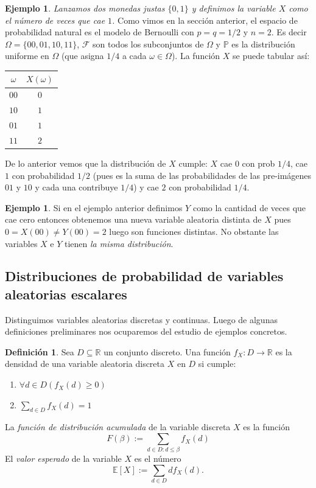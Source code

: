\documentclass[12pt]{amsart}
\theoremstyle{definition}
\newtheorem{definition}[lemma]{Definición}
\newtheorem{examplex}[lemma]{Ejemplo}
\renewcommand{\geq}{\geqslant}
\renewcommand{\leq}{\leqslant}
\newcommand{\PP}{\ensuremath{\mathbb{P}}}
\newcommand{\RR}{\ensuremath{\mathbb{R}}}
\newcommand{\EE}{\ensuremath{\mathbb{E}}}
\newcommand{\calF}{\ensuremath{\mathcal{F}}}
\begin{document}
\begin{examplex} \emph{Lanzamos dos monedas justas $\{0,1\}$ y definimos la variable $X$ como el número de veces que cae $1$.}
Como vimos en la sección anterior, el espacio de probabilidad natural es el modelo de Bernoulli con $p=q=1/2$ y $n=2$. Es decir $\Omega=\{00,01,10,11\}$, $\calF$ son todos los subconjuntos de $\Omega$ y $\PP$ es la distribución uniforme en $\Omega$ (que asigna $1/4$ a cada $\omega\in \Omega$). La función $X$ se puede tabular así:


\begin{center}
\begin{tabular}{c|c}
$\omega$ & $X(\omega)$ \\
\hline
$00$ & $0$ \\
$10$ & $1$ \\
$01$ & $1$ \\
$11$ & $2$
\end{tabular}
\end{center}

De lo anterior vemos que la distribución de $X$ cumple: $X$ cae $0$ con prob $1/4$, cae $1$ con probabilidad $1/2$ (pues es la suma de las probabilidades de las pre-imágenes $01$ y $10$ y cada una contribuye $1/4$) y cae $2$ con probabilidad $1/4$.
\end{examplex}
\begin{examplex} Si en el ejemplo anterior definimos $Y$ como la cantidad de veces que cae cero entonces obtenemos una nueva variable aleatoria distinta de $X$ pues $0=X(00)\neq Y(00)=2$ luego son funciones distintas. No obstante las variables $X$ e $Y$ tienen \emph{la misma distribución}. 
\end{examplex}



\subsection{Distribuciones de probabilidad de variables aleatorias escalares}

Distinguimos variables aleatorias discretas y continuas. Luego de algunas definiciones preliminares nos ocuparemos del estudio de ejemplos concretos.

\begin{definition} Sea $D\subseteq \RR$ un conjunto discreto. Una funci\'on $f_X:D\rightarrow \RR$ es la densidad de una variable aleatoria discreta $X$ en $D$ si cumple:
\begin{enumerate}
\item $\forall d\in D\left(f_X(d)\geq 0\right)$
\item $\sum_{d\in D} f_X(d)=1$
\end{enumerate}  
La \emph{función de distribución acumulada} de la variable discreta $X$ es la función
\[F(\beta):=\sum_{d\in D: d\leq \beta} f_X(d)\] 
El \emph{valor esperado} de la variable $X$ es el número
\[\EE[X]:=\sum_{d\in D} d f_X(d).\]
\end{definition}
\end{document}
